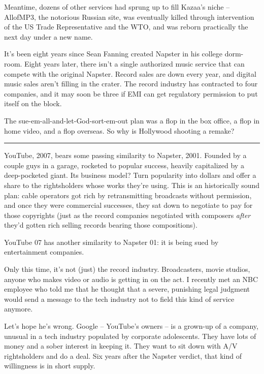 Meantime, dozens of other services had sprung up to fill Kazaa's
niche -- AllofMP3, the notorious Russian site, was eventually
killed through intervention of the US Trade Representative and the
WTO, and was reborn practically the next day under a new name.

It's been eight years since Sean Fanning created Napster in his
college dorm-room. Eight years later, there isn't a single
authorized music service that can compete with the original
Napster. Record sales are down every year, and digital music sales
aren't filling in the crater. The record industry has contracted to
four companies, and it may soon be three if EMI can get regulatory
permission to put itself on the block.

The sue-em-all-and-let-God-sort-em-out plan was a flop in the box
office, a flop in home video, and a flop overseas. So why is
Hollywood shooting a remake?

\begin{center}\rule{3in}{0.4pt}\end{center}

YouTube, 2007, bears some passing similarity to Napster, 2001.
Founded by a couple guys in a garage, rocketed to popular success,
heavily capitalized by a deep-pocketed giant. Its business model?
Turn popularity into dollars and offer a share to the rightsholders
whose works they're using. This is an historically sound plan:
cable operators got rich by retransmitting broadcasts without
permission, and once they were commercial successes, they sat down
to negotiate to pay for those copyrights (just as the record
companies negotiated with composers \emph{after} they'd gotten
rich selling records bearing those compositions).

YouTube 07 has another similarity to Napster 01: it is being sued
by entertainment companies.

Only this time, it's not (just) the record industry. Broadcasters,
movie studios, anyone who makes video or audio is getting in on the
act. I recently met an NBC employee who told me that he thought
that a severe, punishing legal judgment would send a message to the
tech industry not to field this kind of service anymore.

Let's hope he's wrong. Google -- YouTube's owners -- is a grown-up
of a company, unusual in a tech industry populated by corporate
adolescents. They have lots of money and a sober interest in
keeping it. They want to sit down with A/V rightsholders and do a
deal. Six years after the Napster verdict, that kind of willingness
is in short supply.

